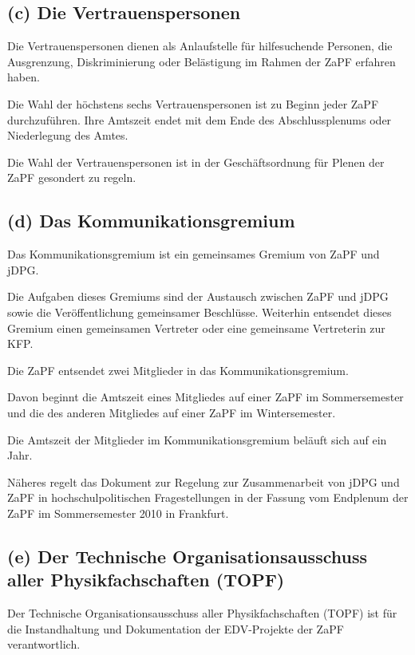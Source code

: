 \documentclass[12pt,oneside]{scrartcl}
\begin{document}
\subsection{(c) Die Vertrauenspersonen%
  \label{c-die-vertrauenspersonen}%
}

Die Vertrauenspersonen dienen als Anlaufstelle für hilfesuchende Personen, die
Ausgrenzung, Diskriminierung oder Belästigung im Rahmen der ZaPF erfahren haben.

Die Wahl der höchstens sechs Vertrauenspersonen ist zu Beginn jeder ZaPF durchzuführen.
Ihre Amtszeit endet mit dem Ende des Abschlussplenums oder Niederlegung des Amtes.

Die Wahl der Vertrauenspersonen ist in der Geschäftsordnung für Plenen der ZaPF
gesondert zu regeln.


\subsection{(d) Das Kommunikationsgremium%
  \label{d-das-kommunikationsgremium}%
}

Das Kommunikationsgremium ist ein gemeinsames Gremium von ZaPF und jDPG.

Die Aufgaben dieses Gremiums sind der Austausch zwischen ZaPF und jDPG sowie
die Veröffentlichung gemeinsamer Beschlüsse.
Weiterhin entsendet dieses Gremium einen gemeinsamen Vertreter oder eine
gemeinsame Vertreterin zur KFP.

Die ZaPF entsendet zwei Mitglieder in das Kommunikationsgremium.

Davon beginnt die Amtszeit eines Mitgliedes auf einer ZaPF im Sommersemester und
die des anderen Mitgliedes auf einer ZaPF im Wintersemester.

Die Amtszeit der Mitglieder im Kommunikationsgremium beläuft sich auf ein Jahr.

Näheres regelt das Dokument zur \textquotedbl{}Regelung zur Zusammenarbeit von jDPG und ZaPF
in hochschulpolitischen Fragestellungen\textquotedbl{} in der Fassung vom Endplenum der ZaPF
im Sommersemester 2010 in Frankfurt.


\subsection{(e) Der Technische Organisationsausschuss aller Physikfachschaften (TOPF)%
  \label{e-der-technische-organisationsausschuss-aller-physikfachschaften-topf}%
}

Der Technische Organisationsausschuss aller Physikfachschaften (TOPF) ist für
die Instandhaltung und Dokumentation der EDV-Projekte der ZaPF verantwortlich.
\end{document}
